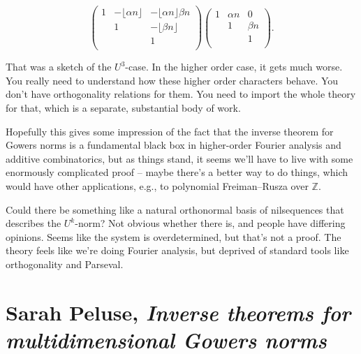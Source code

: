 \documentclass[reqno]{amsart} 
\numberwithin{theorem}{section}
\numberwithin{equation}{section}
\begin{document}
\begin{equation*}
  \begin{pmatrix}
    1    & - \lfloor \alpha n \rfloor & - \lfloor \alpha n \rfloor \beta n \\
         & 1 & - \lfloor \beta n \rfloor \\
         &  & 1 \\
  \end{pmatrix}
  \begin{pmatrix}
    1    & \alpha n & 0 \\
         & 1 & \beta n \\
         &  & 1 \\
  \end{pmatrix}.
\end{equation*}

That was a sketch of the $U^3$-case.  In the higher order case, it gets much worse.  You really need to understand how these higher order characters behave.  You don't have orthogonality relations for them.  You need to import the whole theory for that, which is a separate, substantial body of work.

Hopefully this gives some impression of the fact that the inverse theorem for Gowers norms is a fundamental black box in higher-order Fourier analysis and additive combinatorics, but as things stand, it seems we'll have to live with some enormously complicated proof -- maybe there's a better way to do things, which would have other applications, e.g., to polynomial Freiman--Rusza over $\mathbb{Z}$.

\begin{question}
  Could there be something like a natural orthonormal basis of nilsequences that describes the $U^k$-norm?  Not obvious whether there is, and people have differing opinions.  Seems like the system is overdetermined, but that's not a proof.  The theory feels like we're doing Fourier analysis, but deprived of standard tools like orthogonality and Parseval.
\end{question}

\section{Sarah Peluse, \emph{Inverse theorems for multidimensional Gowers norms}}
\end{document}
